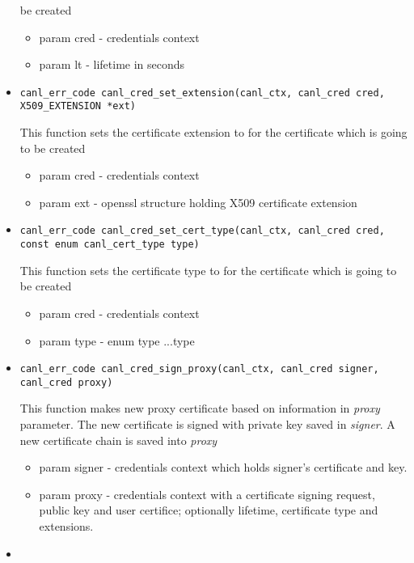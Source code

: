 \begin{itemize}
  be created
  \begin{itemize}
    \item param cred - credentials context
    \item param lt - lifetime in seconds
  \end{itemize}
  \item \begin{verbatim}
canl_err_code canl_cred_set_extension(canl_ctx, canl_cred cred,
X509_EXTENSION *ext)\end{verbatim}
  This function sets the certificate extension to for the certificate 
  which is going to be created
  \begin{itemize}
    \item param cred - credentials context 
    \item param ext - openssl structure holding X509 certificate extension
  \end{itemize}
\item \begin{verbatim}
canl_err_code canl_cred_set_cert_type(canl_ctx, canl_cred cred,
const enum canl_cert_type type)\end{verbatim}
  This function sets the certificate type to for the certificate
  which is going to be created
  \begin{itemize}
    \item param cred - credentials context
    \item param type - \CANL enum type ...\TODO type
  \end{itemize}
  \item \begin{verbatim}
canl_err_code canl_cred_sign_proxy(canl_ctx, canl_cred signer,
canl_cred proxy)\end{verbatim}
  This function makes new proxy certificate based on information in 
  \textit{proxy} parameter. The new certificate is signed with private key 
  saved in \textit{signer}. A new certificate chain is saved 
  into \textit{proxy}
  \begin{itemize}
    \item param signer - credentials context which holds signer's certificate
    and key.
    \item param proxy - credentials context with a certificate 
    signing request, public key and user certifice; optionally lifetime,
    certificate type and extensions.
  \end{itemize}
  \item \begin{verbatim}

\end{verbatim}
\end{itemize}
